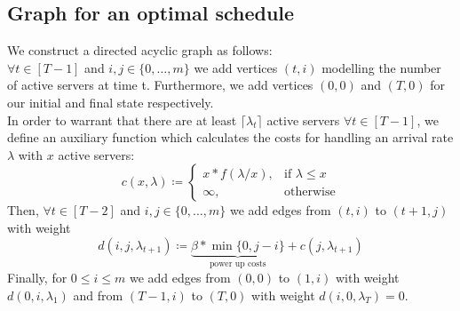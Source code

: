 \documentclass[hidelinks]{article}
\theoremstyle{plain}
\theoremstyle{definition}
\theoremstyle{rem}
\begin{document}
\begin{sloppypar}
\subsection{Graph for an optimal schedule}
We construct a directed acyclic graph as follows:\\
$\forall t\in[T-1]$ and $i,j\in\{0,\ldots,m\}$ we add vertices $(t,i)$ modelling the number of active servers at time t. Furthermore, we add vertices $(0,0)$ and $(T,0)$ for our initial and final state respectively.\\
In order to warrant that there are at least $\lceil\lambda_t\rceil$ active servers $\forall t\in[T-1]$, we define an auxiliary function which calculates the costs for handling an arrival rate $\lambda$ with $x$ active servers:
\begin{equation}
	c(x,\lambda)\coloneqq\begin{cases}
	  x*f(\lambda/x), & \text{if $\lambda\le x$}\\
	  \infty, & \text{otherwise}
	  \end{cases} \label{fct:c}
\end{equation}
Then, $\forall t\in[T-2]$ and $i,j\in\{0,\ldots,m\}$ we add edges from $(t,i)$ to $(t+1,j)$ with weight
\begin{equation}
	d(i,j,\lambda_{t+1})\coloneqq\underbrace{\beta*\min\{0,j-i\}}_{\text{power up costs}}+c(j,\lambda_{t+1})
\end{equation}
Finally, for $0\le i\le m$ we add edges from $(0,0)$ to $(1,i)$ with weight $d(0,i,\lambda_1)$ and from $(T-1,i)$ to $(T,0)$ with weight $d(i,0,\lambda_T)=0$.
\begin{figure}[H]
\centering
{}
\end{figure}
\end{sloppypar}
\end{document}
